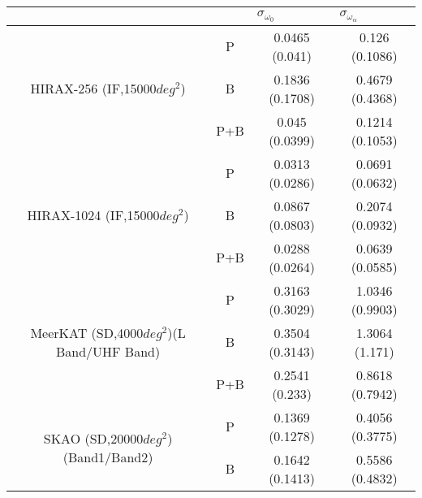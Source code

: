 \documentclass{article}
\begin{document}
\begin{table}[H]
    \centering
    \begin{tabular}{c|c|cc}
    \hline
    \multicolumn{1}{l|}{}      & \multicolumn{1}{l|}{} & \multicolumn{1}{l}{$\sigma_{\omega_0}$} & \multicolumn{1}{l}{$\sigma_{\omega_\alpha}$} \\ \hline
    \multirow{3}{*}{HIRAX-256 (IF,15000$deg^2$)} & P                     & 0.0465 (0.041)                          & 0.126 (0.1086)                               \\
                               & B                     & 0.1836 (0.1708)                         & 0.4679 (0.4368)                              \\
                               & P+B                   & 0.045 (0.0399)                          & 0.1214 (0.1053)                              \\ \hline
    \multirow{3}{*}{HIRAX-1024 (IF,15000$deg^2$)} & P                     & 0.0313 (0.0286)                         & 0.0691 (0.0632)                              \\
                               & B                     & 0.0867 (0.0803)                         & 0.2074 (0.0932)                              \\
                               & P+B                   & 0.0288 (0.0264)                         & 0.0639 (0.0585)                              \\ \hline
    \multirow{3}{*}{MeerKAT (SD,4000$deg^2$)(L Band/UHF Band)}   & P                     & 0.3163 (0.3029)                         & 1.0346 (0.9903)                               \\
                               & B                     & 0.3504 (0.3143)                         & 1.3064 (1.171)                               \\
                               & P+B                   & 0.2541 (0.233)                          & 0.8618 (0.7942)                              \\ \hline
    \multirow{3}{*}{SKAO (SD,20000$deg^2$)(Band1/Band2)}      & P                     & 0.1369 (0.1278)                         & 0.4056 (0.3775)                                \\
                               & B                     & 0.1642 (0.1413)                         & 0.5586 (0.4832)                              \\

\end{tabular}
\end{table}
\end{document}
